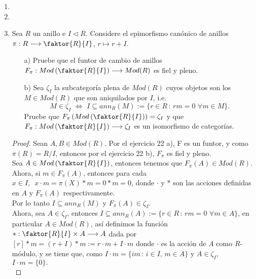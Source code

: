 \documentclass{article}
\theoremstyle{definition}
\theoremstyle{plain}
\theoremstyle{plain}
\theoremstyle{definition}
\theoremstyle{definition}
\theoremstyle{definition}
\theoremstyle{definition}
\theoremstyle{definition}
\theoremstyle{definition}
\begin{document}
\begin{enumerate}[label=\textbf{Ej \arabic*.}]
\begin{proof}
Entonces $\cdot$ es una acción a izquierda de $R$-módulos.\\

Por el ejercicio 8, se tiene que si $M$ y $N$ son $R$-módulos derechos entonces son $R^{op}$ módulos izquierdos.Asi
$\cdot$ es  una acción para $Hom_{R^{op}}(M,N)$ y por el ejercicio 8, $\cdot^{op}$ es una acción que vuelve a 
$Hom_R(M,N)$ un módulo derecho.
\end{proof}

\item
\item
\item Sea $R$ un anillo e $I\lhd R$. Considere el epimorfismo canónico de anillos $\pi:R\longrightarrow \faktor{R}{I}$,\,\,$r\mapsto r+I$.
\begin{itemize}
\item[a)] Pruebe que el funtor de cambio de anillos \\
$F_\pi:Mod\left(\faktor{R}{I}\right)\longrightarrow Mod(R)$ es fiel y pleno.
\item[b)] Sea $\zeta_I$ la subcategoría plena de $Mod(R)$ cuyos objetos son los \\
$M\in Mod(R)$ que son aniquilados por $I$, i.e. 
\[M\in \zeta_I\,\,\iff\,\,I\subseteq ann_R(M):=\{r\in R\,:\, rm=0\,\,\forall m\in M\}.\]
Pruebe que $F_\pi\left(Mod\left(\faktor{R}{I}\right)\right)=\zeta_I$ y que $F_\pi:Mod\left(\faktor{R}{I}\right)\longrightarrow \zeta_I$ 
es un isomorfismo de categorías.
\end{itemize}
\begin{proof}

 Sean $A,B\in Mod(R)$. Por el ejercicio 22 a), F es un funtor, y como $\pi(R)=R/I$, entonces  por el ejercicio 22 b), $F_\pi$ es fiel y pleno.\\

 Sea $A\in Mod\left(\faktor{R}{I}\right)$, entonces tenemos que $F_\pi(A)\in Mod(R)$. Ahora, si $m\in F_\pi(A)$, entonces para cada $x\in I,
 \,\,\,x\cdot m=\pi(X)*m=0*m=0$, donde $\cdot$ y $*$ son las acciones definidas en $A$ y $F_\pi(A)$ respectivamente.\\
Por lo tanto $I\subseteq ann_R(M)$ y $F_\pi(A)\in \zeta_I.$\\

Ahora, sea $A\in \zeta_I$, entonces $I\subseteq ann_R(A):=\{r\in R\,:\,rm=0\,\,\forall m\in A\}$, en particular $A\in Mod(R)$, así 
definimos la función $*:\faktor{R}{I}\times A\longrightarrow A$ dada por $[r]*m=(r+I)*m:=r\cdot m+I\cdot m$ donde $\cdot$ es la 
acción de $A$ como $R$-módulo, y se tiene que, como $I\cdot m=\{im\,:\,i\in I,\, m\in A\}$ y $A\in \zeta_I$, $I\cdot m=\{0\}.$\\


\end{proof}
\end{enumerate}
\end{document}
